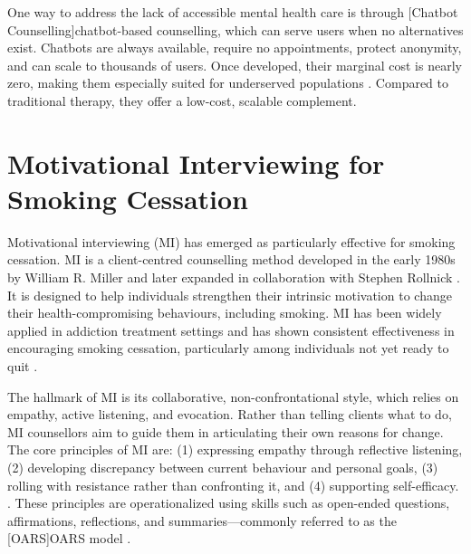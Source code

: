 One way to address the lack of accessible mental health care is through [Chatbot Counselling]chatbot-based counselling, which can serve users when no alternatives exist. Chatbots are always available, require no appointments, protect anonymity, and can scale to thousands of users. Once developed, their marginal cost is nearly zero, making them especially suited for underserved populations \cite{torous2017digital,miner2016smartphone}. Compared to traditional therapy, they offer a low-cost, scalable complement.



\section{Motivational Interviewing for Smoking Cessation}

Motivational interviewing (MI) has emerged as particularly effective for smoking cessation. MI is a client-centred counselling method developed in the early 1980s by William R. Miller and later expanded in collaboration with Stephen Rollnick \cite{miller1991motivational,MillerRollnick2013}. It is designed to help individuals 
strengthen their intrinsic motivation to change their health-compromising behaviours, including smoking. MI has been widely applied in addiction treatment settings and has shown consistent effectiveness in encouraging smoking cessation, particularly among individuals not yet ready to quit \cite{bischof2021evidence,hettema2005meta}.

The hallmark of MI is its collaborative, non-confrontational style, which relies on empathy, active listening, and evocation. Rather than telling clients what to do, MI counsellors aim to guide them in articulating their own reasons for change. The core principles of MI are: (1) expressing empathy through reflective listening, (2) developing discrepancy between current behaviour and personal goals, (3) rolling with resistance rather than confronting it, and (4) supporting self-efficacy. \cite{rollnick2008motivational}. These principles are operationalized using skills such as open-ended questions, affirmations, reflections, and summaries---commonly referred to as the [OARS]OARS model \cite{Miller_2023}.



